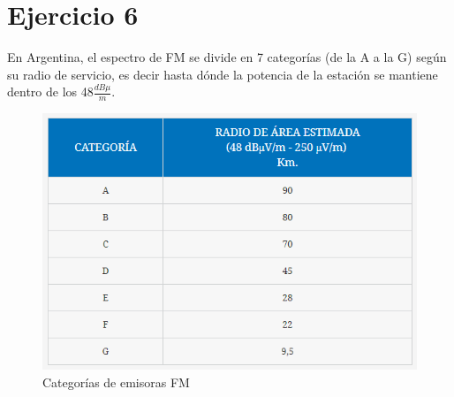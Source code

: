 \documentclass[../../labo_tp5_main.tex]{subfiles}
\begin{document}
\section{Ejercicio 6}

En Argentina, el espectro de FM se divide en 7 categor\'ias (de la A a la G) seg\'un su radio de servicio, es decir hasta d\'onde la potencia de la estaci\'on se mantiene dentro de los 48$\frac{dB\mu}{m}$.

\begin{figure}[H]
	\centering
	\includegraphics[scale=0.6]{imagenes/categorias.png}
	\caption{Categor\'ias de emisoras FM}
\end{figure}
\end{document}
